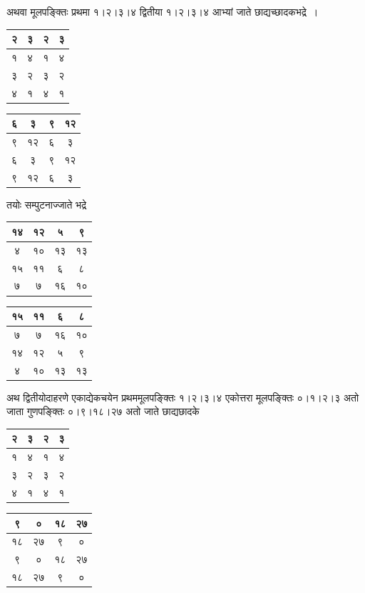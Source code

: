 \documentclass[11pt, openany]{book}
\begin{document}
अथवा मूलपङ्क्तिः प्रथमा १।२।३।४ द्वितीया १।२।३।४ आभ्यां जाते छाद्यच्छादकभद्रे~।	

\begin{table}[h]
\centering
\begin{tabular}{|c|c|c|c|}
	\hline
२ & ३ & २ & ३\\
\hline
१ & ४ & १ & ४ \\
\hline
३ & २ & ३ & २\\
\hline
४ & १ & ४ & १\\
\hline
\end{tabular}\qquad
\begin{tabular}{|c|c|c|c|}
	\hline
६ & ३ & ९ & १२\\
\hline
९ & १२ & ६ & ३\\
\hline
६ & ३ & ९ & १२\\
\hline
९ & १२ & ६ & ३\\
\hline
\end{tabular}
\end{table}
\vspace{-0.5cm}
\begin{center}
तयोः सम्पुटनाज्जाते भद्रे	
\end{center}
\vspace{-0.4cm}
\begin{table}[h]
	\centering
	\begin{tabular}{|c|c|c|c|}
	\hline
१४ & १२ & ५ & ९\\
\hline
४ & १० & १३ & १३\\
\hline
१५ & ११ & ६ & ८\\
\hline
७ & ७ & १६ & १०\\
\hline
\end{tabular}\qquad
	\begin{tabular}{|c|c|c|c|}
	\hline
१५ & ११ & ६ & ८\\
\hline
७ & ७ & १६ & १०\\
\hline
१४ & १२ & ५ & ९\\
\hline
४ & १० & १३ & १३\\
\hline
\end{tabular}
\end{table}

अथ द्वितीयोदाहरणे एकाद्येकचयेन प्रथममूलपङ्क्तिः १।२।३।४ एकोत्तरा मूलपङ्क्तिः ०।१।२।३ अतो जाता गुणपङ्क्तिः ०।९।१८।२७ अतो जाते छाद्यछादके

\begin{center}
	\begin{tabular}{|c|c|c|c|}
\hline
२ & ३ & २ & ३\\
\hline
१ & ४ & १ & ४\\
\hline
३ & २ & ३ & २\\
\hline
४ & १ & ४ & १\\
\hline
\end{tabular}\qquad
\begin{tabular}{|c|c|c|c|}
	\hline
९ & ० & १८ & २७\\
\hline
१८ & २७ & ९ & ०\\
\hline
९ & ० & १८ & २७\\
\hline
१८ & २७ & ९ & ०\\
\hline
\end{tabular}
\end{center}
\end{document}
